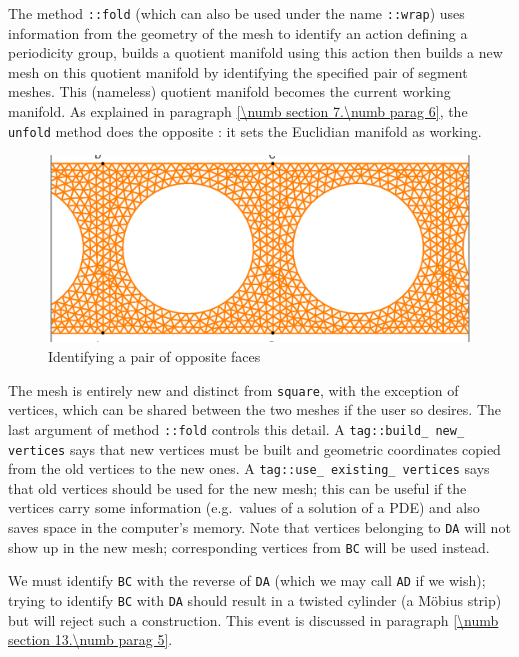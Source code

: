 The method {\small\tt{}::fold} (which can also be used under the name
{\small\tt{}::wrap}) uses information
from the geometry of the mesh to identify an action defining a periodicity group,
builds a quotient manifold using this action then builds a new mesh on this quotient manifold
by identifying the specified pair of segment meshes.
This (nameless) quotient manifold becomes the current working manifold.
As explained in paragraph \ref{\numb section 7.\numb parag 6}, the {\small\tt unfold} method
does the opposite : it sets the Euclidian manifold as working.

\begin{figure}[ht] \centering
  \includegraphics[width=125mm]{cylinder-1.eps}
  \caption{Identifying a pair of opposite faces}
  \label{\numb section 7.\numb fig 15}
\end{figure}

The mesh {\small\tt{}} is entirely new and distinct from {\small\tt square},
with the exception of vertices, which can be shared between the two meshes if the
user so desires.
The last argument of method {\small\tt{}::fold} controls this detail.
A {\small\tt\textcolor{tag}{tag}::build\_\,new\_\,vertices} says that new vertices must be built
and geometric coordinates copied from the old vertices to the new ones.
A {\small\tt\textcolor{tag}{tag}::use\_\,existing\_\,vertices} says that old vertices
should be used for the new mesh; this can be useful if the vertices carry some information
(e.g.\ values of a solution of a PDE) and also saves space in the computer's memory.
Note that vertices belonging to {\small\tt DA} will not show up in the
new mesh; corresponding vertices from {\small\tt BC} will be used instead.

We must identify {\small\tt BC} with the reverse of {\small\tt DA} (which we may call
{\small\tt AD} if we wish); trying to identify {\small\tt BC} with {\small\tt DA} should
result in a twisted cylinder (a M\"obius strip) but {\maniFEM} will reject such a construction.
This event is discussed in paragraph \ref{\numb section 13.\numb parag 5}.


